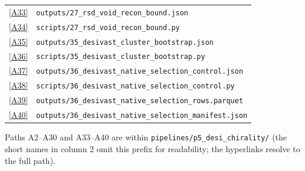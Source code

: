 \documentclass[aps,prd,twocolumn,superscriptaddress,showpacs,preprintnumbers,nofootinbib,longbibliography,floatfix]{revtex4-2}
\newcommand{\repoBase}{https://github.com/Hubify-Projects/bigbounce/blob/main}
\begin{document}
\begin{table}[p]
{\begin{ruledtabular}
\begin{tabular}{lp{}}
\href{\repoBase/pipelines/p5\_desi\_chirality/outputs/27\_rsd\_void\_recon\_bound.json}{[A33]} & \texttt{outputs/27\_rsd\_void\_recon\_bound.json} \\
\href{\repoBase/pipelines/p5\_desi\_chirality/scripts/27\_rsd\_void\_recon\_bound.py}{[A34]} & \texttt{scripts/27\_rsd\_void\_recon\_bound.py} \\
\href{\repoBase/pipelines/p5\_desi\_chirality/outputs/35\_desivast\_cluster\_bootstrap.json}{[A35]} & \texttt{outputs/35\_desivast\_cluster\_bootstrap.json} \\
\href{\repoBase/pipelines/p5\_desi\_chirality/scripts/35\_desivast\_cluster\_bootstrap.py}{[A36]} & \texttt{scripts/35\_desivast\_cluster\_bootstrap.py} \\
\href{\repoBase/pipelines/p5\_desi\_chirality/outputs/36\_desivast\_native\_selection\_control.json}{[A37]} & \texttt{outputs/36\_desivast\_native\_selection\_control.json} \\
\href{\repoBase/pipelines/p5\_desi\_chirality/scripts/36\_desivast\_native\_selection\_control.py}{[A38]} & \texttt{scripts/36\_desivast\_native\_selection\_control.py} \\
\href{\repoBase/pipelines/p5\_desi\_chirality/outputs/36\_desivast\_native\_selection\_rows.parquet}{[A39]} & \texttt{outputs/36\_desivast\_native\_selection\_rows.parquet} \\
\href{\repoBase/pipelines/p5\_desi\_chirality/outputs/36\_desivast\_native\_selection\_manifest.json}{[A40]} & \texttt{outputs/36\_desivast\_native\_selection\_manifest.json} \\
\end{tabular}
\end{ruledtabular}
}%
\end{table}
\clearpage

Paths A2--A30 and A33--A40 are within \texttt{pipelines/p5\_desi\_chirality/} (the
short names in column 2 omit this prefix for readability; the hyperlinks
resolve to the full path).
\end{document}
